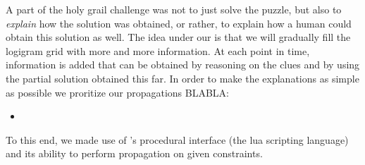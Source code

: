 A part of the holy grail challenge was not to just solve the puzzle, but also to \emph{explain} how the solution was obtained, or rather, to explain how a human could obtain this solution as well. 
The idea under our is that we will gradually fill the logigram grid with more and more information. At each point in time, information is added that can be obtained by reasoning on the clues and by using the partial solution obtained this far. 
In order to make the explanations as simple as possible we proritize our propagations BLABLA: 
\begin{itemize}
 \item 
\end{itemize}


To this end, we made use of \idp's procedural interface (the lua scripting language) and its ability to perform propagation on given constraints. 
